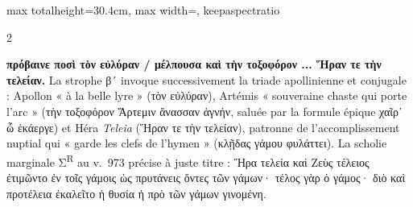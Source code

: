 \documentclass[11pt,twoside]{book}
\newcommand{\expo}[1]{\textsuperscript{#1}}
\newcommand{\grec}[1]{{\policeGr #1}}
\begin{document}
\begin{adjustbox}{max totalheight=30.4cm, max width=\textwidth, keepaspectratio}
\begin{minipage}{\textwidth}
{\begin{multicols}{2}
\par\vspace{1.5pt}
 \textbf{πρόβαινε ποσὶ τὸν εὐλύραν / μέλπουσα καὶ τὴν τοξοφόρον ... Ἥραν τε τὴν τελείαν.} La strophe β´ invoque successivement la triade apollinienne et conjugale : Apollon « à la belle lyre » (\grec{τὸν εὐλύραν}), Artémis « souveraine chaste qui porte l'arc » (\grec{τὴν τοξοφόρον Ἄρτεμιν ἄνασσαν ἁγνήν}, saluée par la formule épique \grec{χαῖρ᾽ ὦ ἑκάεργε}) et Héra \textit{Teleia} (\grec{Ἥραν τε τὴν τελείαν}), patronne de l'accomplissement nuptial qui « garde les clefs de l'hymen » (\grec{κλῇδας γάμου φυλάττει}). La scholie marginale {\policeGr Σ}\expo{R} au v.~973 précise à juste titre : \grec{Ἥρα τελεία καὶ Ζεὺς τέλειος ἐτιμῶντο ἐν τοῖς γάμοις ὡς πρυτάνεις ὄντες τῶν γάμων· τέλος γὰρ ὁ γάμος· διὸ καὶ προτέλεια ἐκαλεῖτο ἡ θυσία ἡ πρὸ τῶν γάμων γινομένη}.
\par\end{multicols}}
\end{minipage}\end{adjustbox}
\newpage
\end{document}
